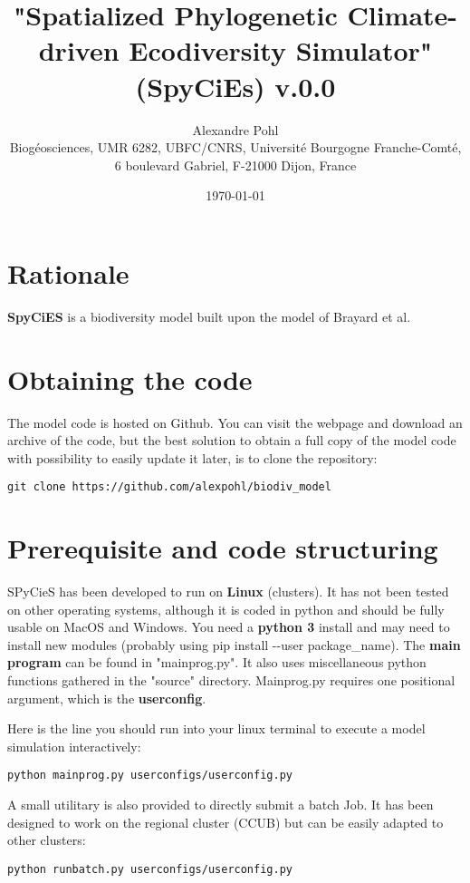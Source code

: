 \documentclass[a4paper, 11pt]{article}
\title{"Spatialized Phylogenetic Climate-driven Ecodiversity Simulator" (SpyCiEs) v.0.0}
\author{Alexandre Pohl\\ Biogéosciences, UMR 6282, UBFC/CNRS, Université Bourgogne Franche-Comté, 6 boulevard Gabriel, F-21000 Dijon, France}
\date{\today}
\begin{document}
\maketitle

\section{Rationale}

\textbf{SpyCiES} is a biodiversity model built upon the model of Brayard et al.

\section{Obtaining the code}

The model code is hosted on Github. You can visit the webpage and download an archive of the code, but the best solution to obtain a full copy of the model code with possibility to easily update it later, is to clone the repository:

\begin{lstlisting}
git clone https://github.com/alexpohl/biodiv_model
\end{lstlisting}

\section{Prerequisite and code structuring}

SPyCieS has been developed to run on \textbf{Linux} (clusters). It has not been tested on other operating systems, although it is coded in python and should be fully usable on MacOS and Windows. You need a \textbf{python 3} install and may need to install new modules (probably using pip install -{}-user package\_name).
The \textbf{main program} can be found in "mainprog.py". It also uses miscellaneous python functions gathered in the "source" directory. Mainprog.py requires one positional argument, which is the \textbf{userconfig}. 

Here is the line you should run into your linux terminal to execute a model simulation interactively:

\begin{lstlisting}
python mainprog.py userconfigs/userconfig.py
\end{lstlisting}

A small utilitary is also provided to directly submit a batch Job. It has been designed to work on the regional cluster (CCUB) but can be easily adapted to other clusters:

\begin{lstlisting}
python runbatch.py userconfigs/userconfig.py
\end{lstlisting}

\end{document}
